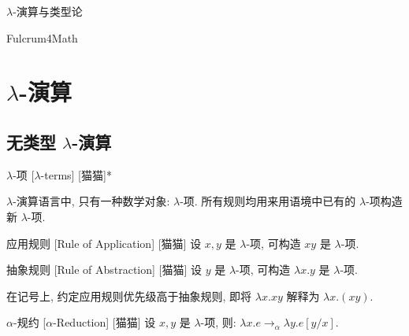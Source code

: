 \documentclass[UTF8]{ctexart}
\begin{document}
\begin{center}
    {\LARGE \(\lambda\)-演算与类型论}

    Fulcrum4Math
\end{center}

\tableofcontents
\newpage

\section{\(\lambda\)-演算}

    \subsection{无类型 \(\lambda\)-演算}
    
        \begin{dfn}
            {\(\lambda\)-项}
            [\(\lambda\)-terms]
            [猫猫]*
        \end{dfn}
        
        \begin{rmk}
            \(\lambda\)-演算语言中, 只有一种数学对象: \(\lambda\)-项. 所有规则均用来用语境中已有的 \(\lambda\)-项构造新 \(\lambda\)-项. 
        \end{rmk}
        
        \begin{rul}
            {应用规则}
            [Rule of Application]
            [猫猫]
            设 \(x,y\) 是 \(\lambda\)-项, 可构造 \(xy\) 是 \(\lambda\)-项. 
        \end{rul}
        
        \begin{rul}
            {抽象规则}
            [Rule of Abstraction]
            [猫猫]
            设 \(y\) 是 \(\lambda\)-项, 可构造 \(\lambda x.y\) 是 \(\lambda\)-项. 
        \end{rul}
        
        \begin{rmk}
            [猫猫]
            在记号上, 约定应用规则优先级高于抽象规则, 即将 \(\lambda x.xy\) 解释为 \(\lambda x.(xy)\). 
        \end{rmk}
        
        \begin{rul}
            []
            {\(\alpha\)-规约}
            [\(\alpha\)-Reduction]
            [猫猫]
            设 \(x,y\) 是 \(\lambda\)-项, 则: \(\lambda x.e \rightarrow_\alpha \lambda y.e[y/x]\). 
        \end{rul}
        
\end{document}
